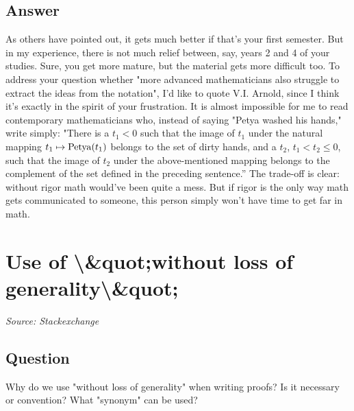 \documentclass{article}
\begin{document}
\subsection*{Answer}
As others have pointed out, it gets much better if that's your first semester. But in my experience, there is not much relief between, say, years 2 and 4 of your studies. Sure, you get more mature, but the material gets more difficult too. To address your question whether "more advanced mathematicians also struggle to extract the ideas from the notation", I'd like to quote V.I. Arnold, since I think it's exactly in the spirit of your frustration. It is almost impossible for me to read contemporary mathematicians who, instead of saying "Petya washed his hands," write simply: "There is a $t_1<0$ such that the image of $t_1$ under the natural mapping $t_1 \mapsto {\rm Petya}(t_1)$ belongs to the set of dirty hands, and a $t_2$, $t_1<t_2 \leq 0$, such that the image of $t_2$ under the above-mentioned mapping belongs to the complement of the set defined in the preceding sentence.'' The trade-off is clear: without rigor math would've been quite a mess. But if rigor is the only way math gets communicated to someone, this person simply won't have time to get far in math.

\newpage

\section{Use of \textbackslash{}&quot;without loss of generality\textbackslash{}&quot;}
\textit{Source: Stackexchange}

\subsection*{Question}
Why do we use "without loss of generality" when writing proofs? Is it necessary or convention? What "synonym" can be used?
\end{document}
